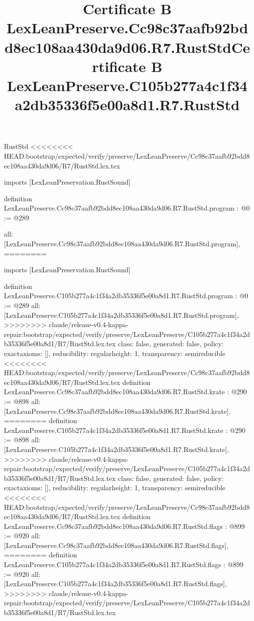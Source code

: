 \begin{lexlean}{RustStd}
<<<<<<<< HEAD:bootstrap/expected/verify/preserve/LexLeanPreserve/Cc98c37aafb92bdd8ec108aa430da9d06/R7/RustStd.lex.tex
\title{Certificate B LexLeanPreserve.Cc98c37aafb92bdd8ec108aa430da9d06.R7.RustStd}
\begin{coremodule}
imports [LexLeanPreservation.RustSound]

definition LexLeanPreserve.Cc98c37aafb92bdd8ec108aa430da9d06.R7.RustStd.program : @0 := @289 {
  all: [LexLeanPreserve.Cc98c37aafb92bdd8ec108aa430da9d06.R7.RustStd.program],
========
\title{Certificate B LexLeanPreserve.C105b277a4c1f34a2db35336f5e00a8d1.R7.RustStd}
\begin{coremodule}
imports [LexLeanPreservation.RustSound]

definition LexLeanPreserve.C105b277a4c1f34a2db35336f5e00a8d1.R7.RustStd.program : @0 := @289 {
  all: [LexLeanPreserve.C105b277a4c1f34a2db35336f5e00a8d1.R7.RustStd.program],
>>>>>>>> claude/release-v0.4-kappa-repair:bootstrap/expected/verify/preserve/LexLeanPreserve/C105b277a4c1f34a2db35336f5e00a8d1/R7/RustStd.lex.tex
  class: false,
  generated: false,
  policy: exact{axioms: []},
  reducibility: regular{height: 1},
  transparency: semireducible
}
<<<<<<<< HEAD:bootstrap/expected/verify/preserve/LexLeanPreserve/Cc98c37aafb92bdd8ec108aa430da9d06/R7/RustStd.lex.tex
definition LexLeanPreserve.Cc98c37aafb92bdd8ec108aa430da9d06.R7.RustStd.krate : @290 := @898 {
  all: [LexLeanPreserve.Cc98c37aafb92bdd8ec108aa430da9d06.R7.RustStd.krate],
========
definition LexLeanPreserve.C105b277a4c1f34a2db35336f5e00a8d1.R7.RustStd.krate : @290 := @898 {
  all: [LexLeanPreserve.C105b277a4c1f34a2db35336f5e00a8d1.R7.RustStd.krate],
>>>>>>>> claude/release-v0.4-kappa-repair:bootstrap/expected/verify/preserve/LexLeanPreserve/C105b277a4c1f34a2db35336f5e00a8d1/R7/RustStd.lex.tex
  class: false,
  generated: false,
  policy: exact{axioms: []},
  reducibility: regular{height: 1},
  transparency: semireducible
}
<<<<<<<< HEAD:bootstrap/expected/verify/preserve/LexLeanPreserve/Cc98c37aafb92bdd8ec108aa430da9d06/R7/RustStd.lex.tex
definition LexLeanPreserve.Cc98c37aafb92bdd8ec108aa430da9d06.R7.RustStd.flags : @899 := @920 {
  all: [LexLeanPreserve.Cc98c37aafb92bdd8ec108aa430da9d06.R7.RustStd.flags],
========
definition LexLeanPreserve.C105b277a4c1f34a2db35336f5e00a8d1.R7.RustStd.flags : @899 := @920 {
  all: [LexLeanPreserve.C105b277a4c1f34a2db35336f5e00a8d1.R7.RustStd.flags],
>>>>>>>> claude/release-v0.4-kappa-repair:bootstrap/expected/verify/preserve/LexLeanPreserve/C105b277a4c1f34a2db35336f5e00a8d1/R7/RustStd.lex.tex
}}}
\end{coremodule}}
\end{coremodule}
\end{lexlean}
